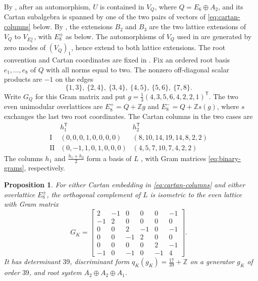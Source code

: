\documentclass[leqno]{article}
\newcommand{\Z}{\ensuremath{\mathbb{Z}}}
\newtheorem{prop}[thm]{Proposition}
\numberwithin{equation}{section}
\begin{document}
By \cite[Proposition 4.1 p.~11 and Theorem 8.5 p.~23]{Arh26a}, after an automorphism, $U$ is contained in $V_Q$, where $Q = E_6 \oplus A_2$, and its Cartan subalgebra is spanned by one of the two pairs of vectors of \eqref{eq:cartan-columns} below. By \cite[(2.8) p.~13 and Theorem 3.9(2) p.~19]{Arh26b}, the extensions $B_2$ and $B_3$ are the two lattice extensions of $V_Q$ to $V_{E_8^\pm}$, with $E_8^\pm$ as below. The automorphisms of $V_Q$ used in \cite{Arh26a} are generated by zero modes of $(V_Q)_1$, hence extend to both lattice extensions. The root convention and Cartan coordinates are fixed in \cite[Section 10.1 p.~27 and the proof of Lemma 10.26 p.~44]{Arh26a}. Fix an ordered root basis $e_1,\ldots,e_8$ of $Q$ with all norms equal to two. The nonzero off-diagonal scalar products are $-1$ on the edges
\[
\{1,3\},\ \{2,4\},\ \{3,4\},\ \{4,5\},\ \{5,6\},\ \{7,8\}.
\]
Write $G_Q$ for this Gram matrix and put
$g = \frac13(4,3,5,6,4,2,2,1)^\mathsf T$. The two even unimodular overlattices are $E_8^+ = Q+\Z g$ and $E_8^- = Q+\Z s(g)$, where $s$ exchanges the last two root coordinates. The Cartan columns in the two cases are
\begin{equation}
\label{eq:cartan-columns}
\begin{array}{c|cc}
& h_1^\mathsf T & h_2^\mathsf T\\ \hline
\mathrm I &(0,0,0,1,0,0,0,0)&(8,10,14,19,14,8,2,2)\\
\mathrm {II}&(0,-1,1,0,1,0,0,0)&(4,5,7,10,7,4,2,2)
\end{array}
\end{equation}
The columns $h_1$ and $\frac{h_1+h_2}{2}$ form a basis of $L$ \cite[Proposition 12.2(3) p.~62]{Arh26a}, with Gram matrices \eqref{eq:binary-grams}, respectively.

\begin{prop}
\label{prop:explicit-K}
For either Cartan embedding in \eqref{eq:cartan-columns} and either overlattice $E_8^\pm$, the orthogonal complement of $L$ is isometric to the even lattice with Gram matrix
\begin{equation}
\label{eq:K-gram}
G_K =
\begin{bmatrix}
2&-1&0&0&0&-1\\
-1&2&0&0&0&0\\
0&0&2&-1&0&-1\\
0&0&-1&2&0&0\\
0&0&0&0&2&-1\\
-1&0&-1&0&-1&4
\end{bmatrix}.
\end{equation}
It has determinant $39$, discriminant form $q_K(g_K) = \frac{17}{39}+\Z$ on a generator $g_K$ of order $39$, and root system $A_2 \oplus A_2 \oplus A_1$.
\end{prop}
\end{document}
